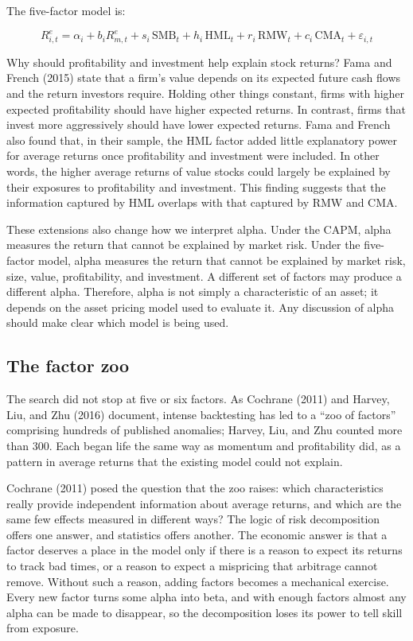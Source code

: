 The five-factor model is:

\begin{equation}
  R^{e}_{i,t} = \alpha_i + b_i R^{e}_{m,t} + s_i \,\mathrm{SMB}_t + h_i \,\mathrm{HML}_t + r_i \,\mathrm{RMW}_t + c_i \,\mathrm{CMA}_t + \varepsilon_{i,t}
  \label{eq:03-ff5}
\end{equation}

Why should profitability and investment help explain stock returns? Fama and French (2015) state that a firm's value depends on its expected future cash flows and the return investors require.
Holding other things constant, firms with higher expected profitability should have higher expected returns. In contrast, firms that invest
more aggressively should have lower expected returns. 
Fama and French also found that, in their sample, the
HML factor added little explanatory power for average returns once profitability and investment were included. In other words, the
higher average returns of value stocks could largely be explained by their exposures to profitability and investment. This finding suggests
that the information captured by HML overlaps with that captured by RMW and CMA.

These extensions also change how we interpret alpha. Under the CAPM, alpha measures the return that cannot be explained by market risk.
Under the five-factor model, alpha measures the return that cannot be explained by market risk, size, value, profitability, and investment.
A different set of factors may produce a different alpha. Therefore, alpha is not simply a characteristic of an asset; it depends on the
asset pricing model used to evaluate it. Any discussion of alpha should make clear which model is being used.

\subsection{The factor zoo}
\label{sec:03-zoo}
The search did not stop at five or six factors. As Cochrane (2011) and Harvey, Liu, and Zhu (2016) document, intense backtesting has led to a ``zoo of factors'' comprising hundreds of published anomalies; Harvey, Liu, and Zhu counted more than 300. Each began life the same way as momentum and profitability did, as a pattern in average returns that the existing model could not explain.

Cochrane (2011) posed the question that the zoo raises: which characteristics really provide independent information about average returns, and which are the same few effects measured in different ways? The logic of risk decomposition offers one answer, and statistics offers another. The economic answer is that a factor deserves a place in the model only if there is a reason to expect its returns to track bad times, or a reason to expect a mispricing that arbitrage cannot remove. Without such a reason, adding factors becomes a mechanical exercise. Every new factor turns some alpha into beta, and with enough factors almost any alpha can be made to disappear, so the decomposition loses its power to tell skill from exposure.

